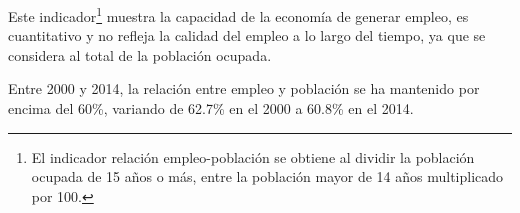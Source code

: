  Este indicador\footnote{El indicador relación empleo-población se obtiene al dividir la población ocupada de 15 años o más,  entre la población mayor de 14 años multiplicado por 100.} muestra la capacidad de la economía de generar empleo, es cuantitativo y no refleja la calidad del empleo a lo largo del tiempo, ya que se considera al total de la población ocupada. 

 Entre 2000 y 2014, la relación entre empleo y población se ha mantenido por encima del 60\%, variando de 62.7\% en el 2000 a 60.8\% en el 2014.